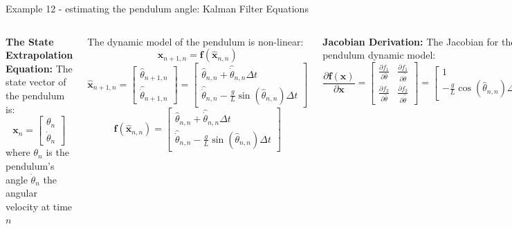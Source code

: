 \begin{frame}{Example 12 - estimating the pendulum angle: Kalman Filter Equations}
\begin{columns}
\textbf{The State Extrapolation Equation:}
The state vector of the pendulum is:
\[
\mathbf{x}_n =
\begin{bmatrix}
\theta_n \\
\dot{\theta}_n
\end{bmatrix}
\]
where $\theta_n$ is the pendulum's angle  $\dot{\theta}_n$ the angular velocity at time $n$

The dynamic model of the pendulum is non-linear:
\[
\hat{\mathbf{x}}_{n+1,n} = \mathbf{f}(\hat{\mathbf{x}}_{n,n})
\]
\[
\hat{\mathbf{x}}_{n+1,n} =
\begin{bmatrix}
\hat{\theta}_{n+1,n} \\
\hat{\dot{\theta}}_{n+1,n}
\end{bmatrix}
=
\begin{bmatrix}
\hat{\theta}_{n,n} + \hat{\dot{\theta}}_{n,n} \Delta t \\
\hat{\dot{\theta}}_{n,n} - \frac{g}{L} \sin(\hat{\theta}_{n,n}) \Delta t
\end{bmatrix}
\]
\[
\mathbf{f}(\hat{\mathbf{x}}_{n,n}) =
\begin{bmatrix}
\hat{\theta}_{n,n} + \hat{\dot{\theta}}_{n,n} \Delta t \\
\hat{\dot{\theta}}_{n,n} - \frac{g}{L} \sin(\hat{\theta}_{n,n}) \Delta t
\end{bmatrix}
\]

\textbf{Jacobian Derivation:} The Jacobian for the pendulum dynamic model:
\[
\frac{\partial \mathbf{f}(\mathbf{x})}{\partial \mathbf{x}} =
\begin{bmatrix}
\frac{\partial f_1}{\partial \hat{\theta}} & \frac{\partial f_1}{\partial \hat{\dot{\theta}}} \\
\frac{\partial f_2}{\partial \hat{\theta}} & \frac{\partial f_2}{\partial \hat{\dot{\theta}}}
\end{bmatrix}
=
\begin{bmatrix}
1 & \Delta t \\
-\frac{g}{L} \cos(\hat{\theta}_{n,n}) \Delta t & 1
\end{bmatrix}
\]

\textbf{The Covariance Extrapolation Equation:}
is given by:
\[
\mathbf{P}_{n+1,n} = \frac{\partial \mathbf{f}(\hat{\mathbf{x}}_{n,n})}{\partial \mathbf{x}} \mathbf{P}_{n,n} \left( \frac{\partial \mathbf{f}(\hat{\mathbf{x}}_{n,n})}{\partial \mathbf{x}} \right)^T + \mathbf{Q}
\]
\vspace*{-55pt}


\end{columns}
\end{frame}
